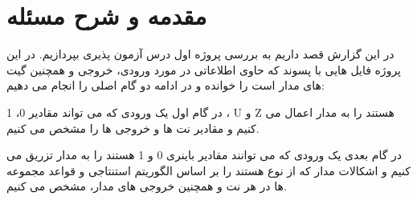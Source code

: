 \section{مقدمه و شرح مسئله}

در این گزارش قصد داریم به بررسی پروژه اول درس آزمون پذیری بپردازیم. در این پروژه فایل هایی با پسوند 
که حاوی اطلاعاتی در مورد ورودی، خروجی و همچنین گیت های مدار است را خوانده و در ادامه دو گام اصلی را انجام می دهیم: 
\begin{inparaenum}
	\item 
	در گام اول یک ورودی که می تواند مقادیر 0، 1 ، U و Z هستند را به مدار اعمال می کنیم و مقادیر نت ها و خروجی ها را مشخص می کنیم.
	\item 
	در گام بعدی یک ورودی که می توانند مقادیر باینری 0 و 1 هستند را به مدار تزریق می کنیم و اشکالات مدار که از نوع 
	 هستند را بر اساس الگوریتم استنتاجی 
	و قواعد مجموعه ها در هر نت و همچنین خروجی های مدار، مشخص می کنیم.
\end{inparaenum}
